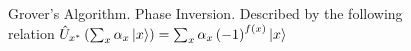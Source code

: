 \begin{figure}
\centering



\caption{Grover's Algorithm. Phase Inversion. Described by the following
  relation  $\hat{U}_{x^{\ast}}\left(\sum_x \alpha_x
  \ket{x}\right) =  
\sum_x \alpha_x \left(-1\right)^{f\left(x\right)}\ket{x}$}
\label{figQuantCompGroverInv}
\end{figure}